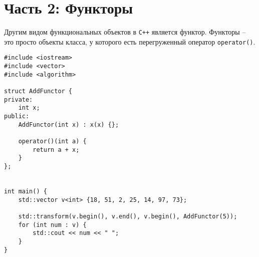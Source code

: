 \documentclass{article}
\begin{document}
\newpage
\section*{Часть 2: Функторы}
Другим видом функциональных объектов в \texttt{C++} является функтор. Функторы -- это просто объекты класса, у которого есть перегруженный оператор \texttt{operator()}.
\begin{lstlisting}
#include <iostream>
#include <vector>
#include <algorithm>

struct AddFunctor {
private:
    int x;
public:
    AddFunctor(int x) : x(x) {};
    
    operator()(int a) {
        return a + x;
    }
};


int main() {
    std::vector v<int> {18, 51, 2, 25, 14, 97, 73};
    
    std::transform(v.begin(), v.end(), v.begin(), AddFunctor(5));
    for (int num : v) {
        std::cout << num << " ";
    } 
}
\end{lstlisting}
\end{document}

